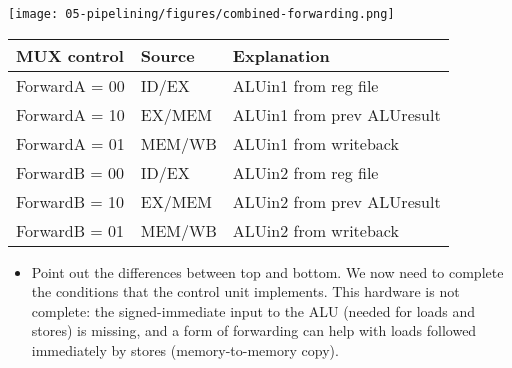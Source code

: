 \begin{frame}[fragile]
 \begin{center}
\texttt{[image: 05-pipelining/figures/combined-forwarding.png]}     
 \end{center}

{\footnotesize
 \begin{center}
\begin{tabular}{|l|l|l|}\hline
MUX control & Source & Explanation \\ \hline
ForwardA = {\color{red}00} & {\color{red}ID/EX} & {\color{red}ALUin1 from reg file}\\
ForwardA = {\color{blue}10} &  {\color{blue}EX/MEM} &  {\color{blue}ALUin1 from prev ALUresult}\\
ForwardA = {\color{orange}01} & {\color{orange}MEM/WB} & {\color{orange}ALUin1 from writeback} \\\hline
ForwardB = {\color{red}00} & {\color{red}ID/EX} & {\color{red}ALUin2 from reg file}\\
ForwardB = {\color{blue}10}&  {\color{blue}EX/MEM} &  {\color{blue}ALUin2 from prev ALUresult}\\
ForwardB = {\color{orange}01} & {\color{orange}MEM/WB} & {\color{orange}ALUin2 from writeback}\\ \hline
\end{tabular}
\end{center}}
\BNotes\ifnum{}

\begin{itemize}
\item
Point out the differences between top and bottom. We now need to
complete the conditions that the control unit implements. This
hardware is not complete: the signed-immediate input to the ALU
(needed for loads and stores) is missing, and a form of forwarding can
help with loads followed immediately by stores (memory-to-memory
copy).

\end{itemize}
\fi\ENotes
\end{frame}


